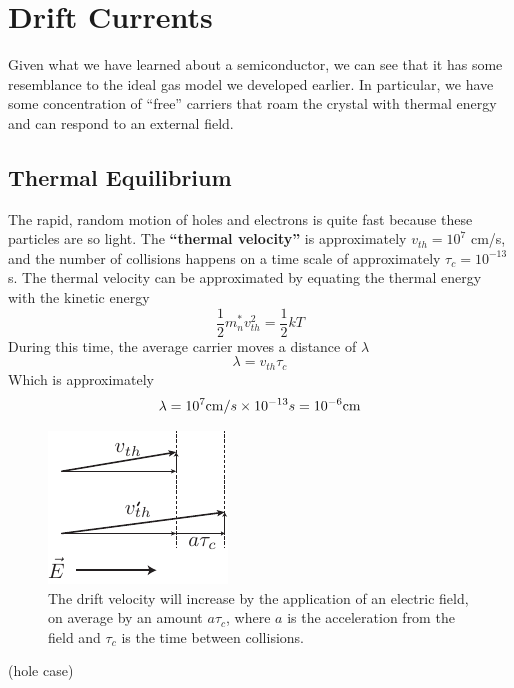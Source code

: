 \section{Drift Currents}
Given what we have learned about a semiconductor, we can see that it has some resemblance to the ideal gas model we developed earlier.  In particular, we have some concentration of “free” carriers that roam the crystal with thermal energy and can respond to an external field.  
\subsection{Thermal Equilibrium}
The rapid, random motion of holes and electrons is quite fast because these particles are so light.  The \textbf{“thermal velocity”} is approximately $v_{th} = 10^7$ cm/s, and the number of collisions happens on a time scale of approximately $\tau_c = 10^{-13}$s.  The thermal velocity can be approximated by equating the thermal energy with the kinetic energy
    \begin{equation}
        {\frac{1}{2}}m_n^*v_{th}^2 = {\frac{1}{2}}kT
    \end{equation}
During this time, the average carrier moves a distance of $\lambda$
    \begin{equation}
        \lambda = {v_{th}}{\tau _c}
    \end{equation}
Which is approximately
    \begin{equation}
        \lambda = {10^7}{\rm{cm}}/s \times {10^{ - 13}}s = {10^{ - 6}}{\rm{cm}}
    \end{equation}
\begin{figure}[tb]
\centering
\includegraphics[width=.3\columnwidth]{drift_field}
\caption{The drift velocity will increase by the application of an electric field, on average by an amount $a \tau_c$, where $a$ is the acceleration from the field and $\tau_c$ is the time between collisions.}
\label{fig:drift_field}
\end{figure}
(hole case)
